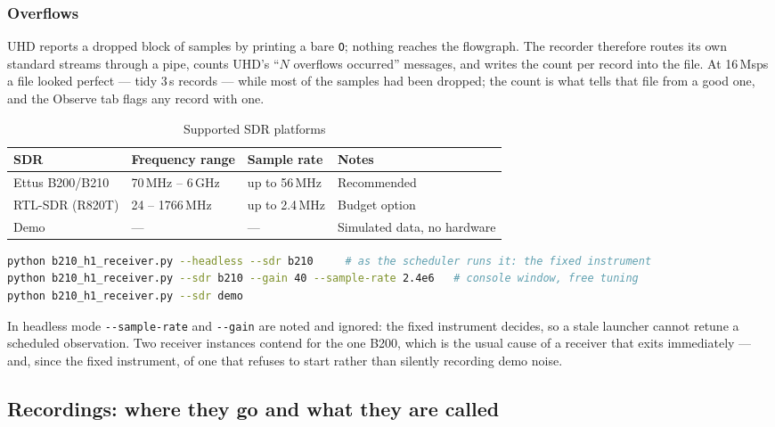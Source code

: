 \documentclass[11pt,a4paper]{article}
\begin{document}
\subsubsection{Overflows}

UHD reports a dropped block of samples by printing a bare \texttt{O}; nothing reaches the flowgraph. The recorder therefore routes its own standard streams through a pipe, counts UHD's ``$N$ overflows occurred'' messages, and writes the count per record into the file. At 16\,Msps a file looked perfect --- tidy 3\,s records --- while most of the samples had been dropped; the count is what tells that file from a good one, and the Observe tab flags any record with one.

\begin{table}[H]
\centering
\caption{Supported SDR platforms}
\begin{tabular}{llll}
\toprule
\textbf{SDR} & \textbf{Frequency range} & \textbf{Sample rate} & \textbf{Notes} \\
\midrule
Ettus B200/B210 & 70\,MHz -- 6\,GHz & up to 56\,MHz & Recommended \\
RTL-SDR (R820T) & 24 -- 1766\,MHz & up to 2.4\,MHz & Budget option \\
Demo & --- & --- & Simulated data, no hardware \\
\bottomrule
\end{tabular}
\end{table}

\begin{lstlisting}[language=bash,caption={Receiver command line}]
python b210_h1_receiver.py --headless --sdr b210     # as the scheduler runs it: the fixed instrument
python b210_h1_receiver.py --sdr b210 --gain 40 --sample-rate 2.4e6   # console window, free tuning
python b210_h1_receiver.py --sdr demo
\end{lstlisting}

In headless mode \texttt{-{}-sample-rate} and \texttt{-{}-gain} are noted and ignored: the fixed instrument decides, so a stale launcher cannot retune a scheduled observation. Two receiver instances contend for the one B200, which is the usual cause of a receiver that exits immediately --- and, since the fixed instrument, of one that refuses to start rather than silently recording demo noise.

\subsection{Recordings: where they go and what they are called}
\end{document}
